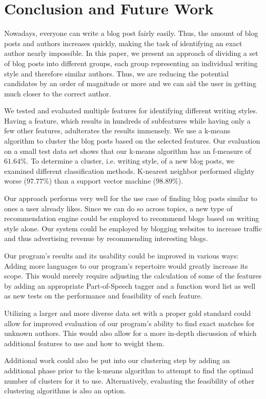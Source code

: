 \section{Conclusion and Future Work}
\label{sec:conclusion}


Nowadays, everyone can write a blog post fairly easily.
Thus, the amount of blog posts and authors increases quickly, making the task of identifying an exact author nearly impossible.
In this paper, we present an approach of dividing a set of blog posts into different groups, each group representing an individual writing style and therefore similar authors.
Thus, we are reducing the potential candidates by an order of magnitude or more and we can aid the user in getting much closer to the correct author.


We tested and  evaluated multiple features for identifying different writing styles.
Having a feature, which results in hundreds of subfeatures while having only a few other features, adulterates the results immensely.
We use a k-means algorithm to cluster the blog posts based on the selected features.
Our evaluation on a small test data set shows that our k-means algorithm has an f-measure of $61.64\%$.
To determine a cluster, i.e. writing style, of a new blog posts, we examined different classification methods.
K-nearest neighbor performed slighty worse ($97.77\%$) than a support vector machine ($98.89\%$).


Our approach performs very well for the use case of finding blog posts similar to ones a user already likes.
Since we can do so across topics, a new type of recommendation engine could be employed to recommend blogs based on writing style alone.
Our system could be employed by blogging websites to increase traffic and thus advertising revenue by recommending interesting blogs.


Our program’s results and its usability could be improved in various ways: Adding more languages to our program’s repertoire would greatly increase its scope.
This would merely require adjusting the calculation of some of the features by adding an appropriate Part-of-Speech tagger and a function word list as well as new tests on the performance and feasibility of each feature.


Utilizing a larger and more diverse data set with a proper gold standard could allow for improved evaluation of our program’s ability to find exact matches for unknown authors.
This would also allow for a more in-depth discussion of which additional features to use and how to weight them.


Additional work could also be put into our clustering step by adding an additional phase prior to the k-means algorithm to attempt to find the optimal number of clusters for it to use.
Alternatively, evaluating the feasibility of other clustering algorithms is also an option.